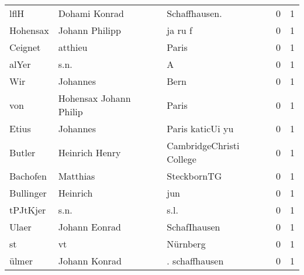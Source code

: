 \begin{tabular}{llllrr}
                     lflH &                      Dohami Konrad &             &                              Schaffhausen.  &          0 &         1 \\
                 Hohensax &                     Johann Philipp &             &                                     ja ru f &          0 &         1 \\
                  Ceignet &                            atthieu &             &                                       Paris &          0 &         1 \\
                    alYer &                               s.n. &             &                                           A &          0 &         1 \\
                      Wir &                           Johannes &             &                                        Bern &          0 &         1 \\
                      von &             Hohensax Johann Philip &             &                                       Paris &          0 &         1 \\
                    Etius &                           Johannes &             &                            Paris katicUi yu &          0 &         1 \\
                   Butler &                     Heinrich Henry &             &                    CambridgeChristi College &          0 &         1 \\
                 Bachofen &                           Matthias &             &                                 SteckbornTG &          0 &         1 \\
                Bullinger &                           Heinrich &             &                                         jun &          0 &         1 \\
                 tPJtKjer &                               s.n. &             &                                        s.l. &          0 &         1 \\
                    Ulaer &                      Johann Eonrad &             &                                SchafIhausen &          0 &         1 \\
                       st &                                 vt &             &                                    Nürnberg &          0 &         1 \\
                    ülmer &                      Johann Konrad &             &                              . schaffhausen &          0 &         1 \\

\end{tabular}
